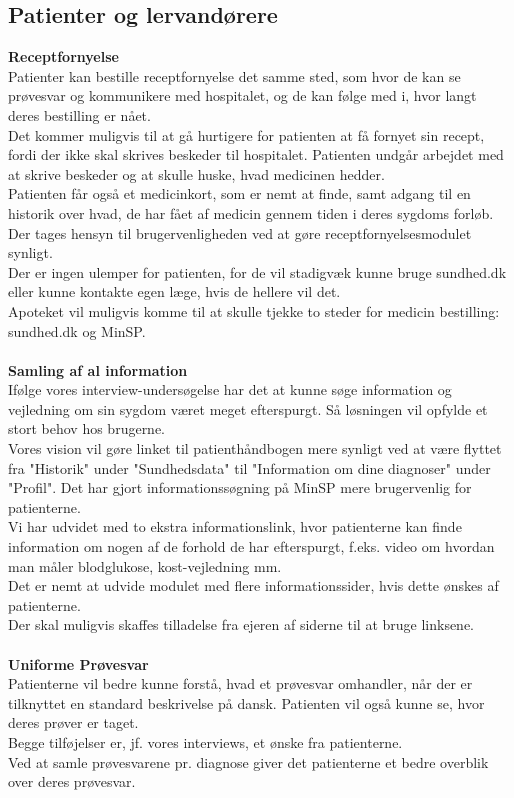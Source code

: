 \subsection{Patienter og lervandørere}
\textbf{Receptfornyelse}\\
Patienter kan bestille receptfornyelse det samme sted, som hvor de kan se prøvesvar og kommunikere med hospitalet, og de kan følge med i, hvor langt deres bestilling er nået.\\
Det kommer muligvis til at gå hurtigere for patienten at få fornyet sin recept, fordi der ikke skal skrives beskeder til hospitalet. Patienten undgår arbejdet med at skrive beskeder og at skulle huske, hvad medicinen hedder.\\
Patienten får også et medicinkort, som er nemt at finde, samt adgang til en historik over hvad, de har fået af medicin gennem tiden i deres sygdoms forløb.\\
Der tages hensyn til brugervenligheden ved at gøre receptfornyelsesmodulet synligt.\\ 
Der er ingen ulemper for patienten, for de vil stadigvæk kunne bruge sundhed.dk eller kunne kontakte egen læge, hvis de hellere vil det.\\
Apoteket vil muligvis komme til at skulle tjekke to steder for medicin bestilling: sundhed.dk og MinSP.
\\\\
\textbf{Samling af al information}\\
Ifølge vores interview-undersøgelse har det at kunne søge information og vejledning om sin sygdom været meget efterspurgt. Så løsningen vil opfylde et stort behov hos brugerne. \\
Vores vision vil gøre linket til patienthåndbogen mere synligt ved at være flyttet fra "Historik" under "Sundhedsdata" til "Information om dine diagnoser" under "Profil". Det har gjort informationssøgning på MinSP mere brugervenlig for patienterne.\\
Vi har udvidet med to ekstra informationslink, hvor patienterne kan finde information om nogen af de forhold de har efterspurgt, f.eks. video om hvordan man måler blodglukose, kost-vejledning mm.\\
Det er nemt at udvide modulet med flere informationssider, hvis dette ønskes af patienterne.\\
Der skal muligvis skaffes tilladelse fra ejeren af siderne til at bruge linksene.
\\\\
\textbf{Uniforme Prøvesvar}\\
Patienterne vil bedre kunne forstå, hvad et prøvesvar omhandler, når der er tilknyttet en standard beskrivelse på dansk. Patienten vil også kunne se, hvor deres prøver er taget.\\
Begge tilføjelser er, jf. vores interviews, et ønske fra patienterne.\\
Ved at samle prøvesvarene pr. diagnose giver det patienterne et bedre overblik over deres prøvesvar.
